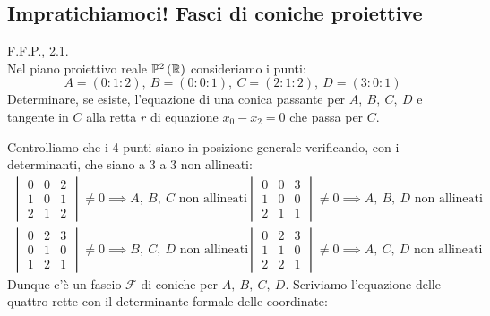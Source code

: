 \subsection{Impratichiamoci! Fasci di coniche proiettive}
\begin{exercise} \textsc{F.F.P., 2.1.}\\
	Nel piano proiettivo reale $\proj[2]{\realset}$ consideriamo i punti:
	\begin{equation*}
		A=(0\colon 1 \colon 2),\ B=(0\colon 0\colon 1),\ C=(2\colon1\colon2),\ D=(3\colon0\colon1)
	\end{equation*}
	Determinare, se esiste, l'equazione di una conica passante per $A,\ B,\ C,\ D$ e tangente in $C$ alla retta $r$ di equazione $x_0-x_2=0$ che passa per $C$.
\end{exercise}
\begin{solution}
	Controlliamo che i 4 punti siano in posizione generale verificando,  con i determinanti, che siano a 3 a 3 non allineati:
		\begin{equation*}
			\begin{array}{ll}
				\begin{vmatrix}
					0 & 0 & 2\\
					1 & 0 & 1\\
					2 & 1 & 2
				\end{vmatrix} \neq 0 \implies A,\ B,\ C \text{ non allineati} & 
				\quad\begin{vmatrix}
					0 & 0 & 3\\
					1 & 0 & 0\\
					2 & 1 & 1
				\end{vmatrix} \neq 0 \implies A,\ B,\ D \text{ non allineati} \\
			\begin{vmatrix}
				0 & 2 & 3\\
				0 & 1 & 0\\
				1 & 2 & 1
			\end{vmatrix} \neq 0 \implies B,\ C,\ D \text{ non allineati} &
			\quad \begin{vmatrix}
				0 & 2 & 3\\
				1 & 1 & 0\\
				2 & 2 & 1
			\end{vmatrix} \neq 0 \implies A,\ C,\ D \text{ non allineati}
			\end{array}
		\end{equation*}
	Dunque c'è un fascio $\mathcal{F}$ di coniche per $A,\ B,\ C,\ D$. Scriviamo l'equazione delle quattro rette con il determinante formale delle coordinate:

\end{solution}
